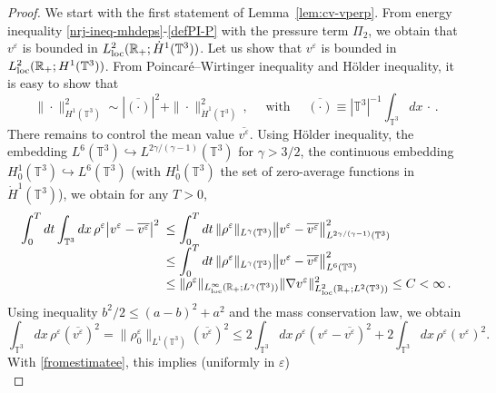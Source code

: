 \documentclass[11pt,reqno]{amsart}
\def \R{{\mathbb{R}}}
\def \T{{\mathbb{T}}}
\begin{document}
\begin{proof}
  We start with the first statement of Lemma~\ref{lem:cv-vperp}. From energy inequality \eqref{nrj-ineq-mhdeps}-\eqref{defPI-P} with the pressure term $\Pi_2$,  we obtain that  $v^\varepsilon$ is  bounded in $L_{\rm loc}^2(\R_+; \dot H^1 (\T^3))$. Let us show that $v^\varepsilon$ is  bounded in $L_{\rm loc}^2(\R_+; H^1 (\T^3))$. From  Poincar\'e--Wirtinger inequality and H\"older inequality, it is easy to show that
 \[
 \|\cdot \|_{H^1(\T^3)}^2 \sim | \overline{(\cdot)}  |^2 + \| \cdot \|_{\dot H^1(\T^3)}^2 \, , \quad \mbox{ with } \quad \overline{(\cdot)} \equiv |\T^3|^{-1}\int_{\T^3} dx\,  \cdot\, .
 \]
 There remains to control the mean value $ \overline{v^\varepsilon} $. Using H\"older inequality, the embedding $L^6(\T^3) \hookrightarrow L^{2\gamma/(\gamma-1)}(\T^3)$ for $\gamma>3/2$, the continuous embedding $ H_0^1(\T^3) \hookrightarrow L^6(\T^3)$ (with $H_0^1(\T^3)$ the set of zero-average functions in $\dot H^1(\T^3)$), we obtain for any $T>0$,
 \begin{equation}\label{fromestimatee}
   \begin{array}{rl} \displaystyle \int_0^Tdt \int_{\T^3} dx \, \rho^\varepsilon \big|v^\varepsilon - \overline{v^\varepsilon} \big|^2 \! \! \!
     & \displaystyle \leq    \int_0^Tdt \,\| \rho^\varepsilon\|_{L^\gamma(\T^3)}  \big \|v^\varepsilon - \overline{v^\varepsilon}  \big\|_{L^{2\gamma/(\gamma-1)}(\T^3)}^2
     \\
     & \displaystyle \leq       \int_0^Tdt \, \| \rho^\varepsilon\|_{L^\gamma(\T^3)}  \big \|v^\varepsilon - \overline{v^\varepsilon}  \big\|_{L^6(\T^3)}^2 \\
     & \displaystyle \leq  \| \rho^\varepsilon\|_{L_{\rm loc}^\infty(\R_+;L^\gamma(\T^3))} \| \nabla v^\varepsilon \|_{L_{\rm loc}^2(\R_+;L^2(\T^3))}^2 \leq  { C} < \infty\,.
   \end{array}
 \end{equation}
 Using inequality $b^2/2 \leq (a-b)^2+ a^2$ and the mass conservation law, we obtain
 \[
 \int_{\T^3} dx \, \rho^\varepsilon (\overline{ v^\varepsilon})^2 = \| \rho_0^\varepsilon\|_{L^1(\T^3)} (\overline{ v^\varepsilon})^2 \leq 2 \int_{\T^3} dx \, \rho^\varepsilon (v^\varepsilon - \overline{ v^\varepsilon})^2 + 2 \int_{\T^3} dx \, \rho^\varepsilon (v^\varepsilon)^2 .
 \]
 With \eqref{fromestimatee}, this implies (uniformly in $ \varepsilon $)
 \begin{equation*}

\end{equation*}
\end{proof}
\end{document}
